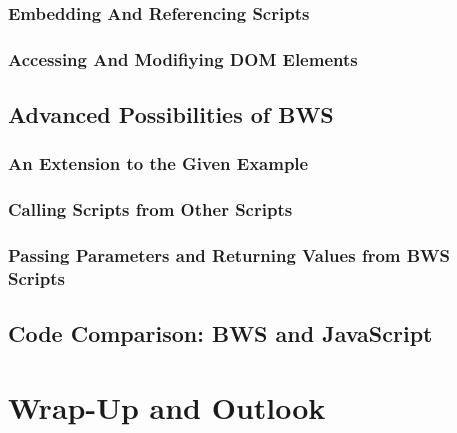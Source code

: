    

  \subsection{Embedding And Referencing Scripts}

 

  \subsection{Accessing And Modifiying DOM Elements}


 \section{Advanced Possibilities of BWS}
  \subsection{An Extension to the Given Example}
  \subsection{Calling Scripts from Other Scripts}
  \subsection{Passing Parameters and Returning Values from BWS Scripts}
 \section{Code Comparison: BWS and JavaScript}
\chapter{Wrap-Up and Outlook}